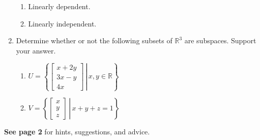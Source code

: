 \documentclass[letterpaper,12pt]{amsart}
\newcommand{\R}{\mathbb{R}}
\newcommand{\bbm}{\begin{bmatrix}}
\newcommand{\ebm}{\end{bmatrix}}
\begin{document}
\begin{enumerate}
\medskip

\begin{enumerate}
 \item Linearly dependent.
 \item Linearly independent.
\end{enumerate}

\bigskip

 \item Determine whether or not the following subsets of $\R^3$ are subspaces. Support your answer.

\medskip

\begin{multicols}{2}
\begin{enumerate}
 \item $U = \left\{\left.\bbm x+2y\\3x-y\\4x\ebm \,\right|\, x,y\in\R\right\}$
 \item $V = \left\{\left.\bbm x\\y\\z\ebm\,\right|\, x+y+z=1\right\}$
\end{enumerate}
\end{multicols}

\bigskip


\end{enumerate}
\textbf{See page 2} for hints, suggestions, and advice.

\newpage
\end{document}
